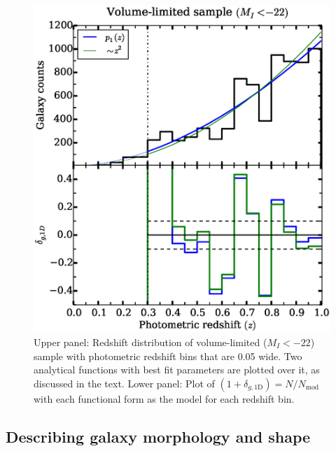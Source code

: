 \documentclass[twocolumn,useAMS,usenatbib]{mn2e}
\begin{document}
\begin{figure}
 \centering
  \includegraphics[width=\columnwidth]{redshift_vollimited}
  \caption{
Upper panel: Redshift distribution of volume-limited ($M_I <  -22$)
sample with photometric redshift bins that are 0.05 wide. Two
analytical functions with best fit parameters are plotted over it, as
discussed in the text. 
           Lower panel: Plot of $(1+\delta_{g,\text{1D}}) =
           N/N_{\text{mod}}$ with each functional form as the model
           for each redshift bin. } 
  \label{fig:redshift_vollimited}
\end{figure}

\subsection{Describing galaxy morphology and shape}
\label{sub:axisratio}
\end{document}

